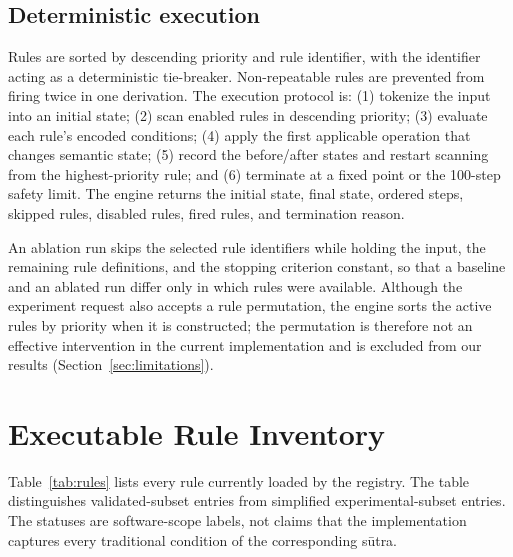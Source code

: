 \documentclass[conference]{IEEEtran}
\begin{document}
\subsection{Deterministic execution}
Rules are sorted by descending priority and rule identifier, with the identifier acting as a deterministic tie-breaker. Non-repeatable rules are prevented from firing twice in one derivation. The execution protocol is: (1) tokenize the input into an initial state; (2) scan enabled rules in descending priority; (3) evaluate each rule's encoded conditions; (4) apply the first applicable operation that changes semantic state; (5) record the before/after states and restart scanning from the highest-priority rule; and (6) terminate at a fixed point or the 100-step safety limit. The engine returns the initial state, final state, ordered steps, skipped rules, disabled rules, fired rules, and termination reason.

An ablation run skips the selected rule identifiers while holding the input, the remaining rule definitions, and the stopping criterion constant, so that a baseline and an ablated run differ only in which rules were available. Although the experiment request also accepts a rule permutation, the engine sorts the active rules by priority when it is constructed; the permutation is therefore not an effective intervention in the current implementation and is excluded from our results (Section~\ref{sec:limitations}).

\section{Executable Rule Inventory}
Table~\ref{tab:rules} lists every rule currently loaded by the registry. The table distinguishes validated-subset entries from simplified experimental-subset entries. The statuses are software-scope labels, not claims that the implementation captures every traditional condition of the corresponding s\=utra.
\end{document}
